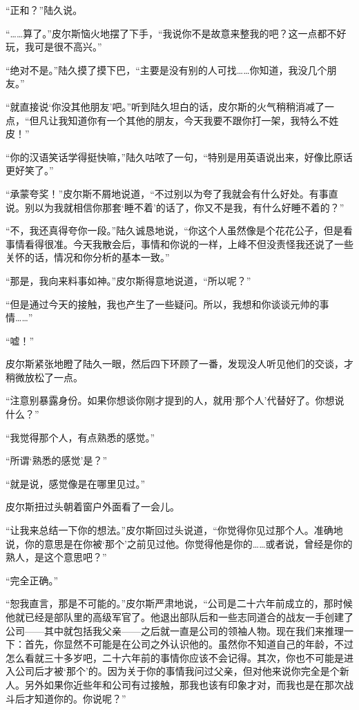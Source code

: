 “正和？”陆久说。

“……算了。”皮尔斯恼火地摆了下手，“我说你不是故意来整我的吧？这一点都不好玩，我可是很不高兴。”

“绝对不是。”陆久摸了摸下巴，“主要是没有别的人可找……你知道，我没几个朋友。”

“就直接说‘你没其他朋友’吧。”听到陆久坦白的话，皮尔斯的火气稍稍消减了一点，“但凡让我知道你有一个其他的朋友，今天我要不跟你打一架，我特么不姓皮！”

“你的汉语笑话学得挺快嘛，”陆久咕哝了一句，“特别是用英语说出来，好像比原话更好笑了。”

“承蒙夸奖！”皮尔斯不屑地说道，“不过别以为夸了我就会有什么好处。有事直说。别以为我就相信你那套‘睡不着’的话了，你又不是我，有什么好睡不着的？”

“不，我还真得夸你一段。”陆久诚恳地说，“你这个人虽然像是个花花公子，但是看事情看得很准。今天我散会后，事情和你说的一样，上峰不但没责怪我还说了一些关怀的话，情况和你分析的基本一致。”

“那是，我向来料事如神。”皮尔斯得意地说道，“所以呢？”

“但是通过今天的接触，我也产生了一些疑问。所以，我想和你谈谈元帅的事情……”

“嘘！”

皮尔斯紧张地瞪了陆久一眼，然后四下环顾了一番，发现没人听见他们的交谈，才稍微放松了一点。

“注意别暴露身份。如果你想谈你刚才提到的人，就用‘那个人’代替好了。你想说什么？”

“我觉得那个人，有点熟悉的感觉。”

“所谓‘熟悉的感觉’是？”

“就是说，感觉像是在哪里见过。”

皮尔斯扭过头朝着窗户外面看了一会儿。

“让我来总结一下你的想法。”皮尔斯回过头说道，“你觉得你见过那个人。准确地说，你的意思是在你被‘那个’之前见过他。你觉得他是你的……或者说，曾经是你的熟人，是这个意思吧？”

“完全正确。”

“恕我直言，那是不可能的。”皮尔斯严肃地说，“公司是二十六年前成立的，那时候他就已经是部队里的高级军官了。他退出部队后和一些志同道合的战友一手创建了公司——其中就包括我父亲——之后就一直是公司的领袖人物。现在我们来推理一下：首先，你显然不可能是在公司之外认识他的。虽然你不知道自己的年龄，不过怎么看就三十多岁吧，二十六年前的事情你应该不会记得。其次，你也不可能是进入公司后才被‘那个’的。因为关于你的事情我问过父亲，但对他来说你完全是个新人。另外如果你近些年和公司有过接触，那我也该有印象才对，而我也是在那次战斗后才知道你的。你说呢？”


